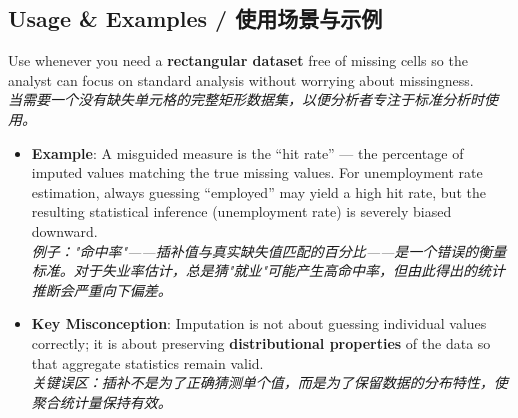 \documentclass[9pt, a4paper]{article}
\begin{document}
\subsection{Usage \& Examples / 使用场景与示例}
Use whenever you need a \textbf{rectangular dataset} free of missing cells so the analyst can focus on standard analysis without worrying about missingness.\\
\textit{当需要一个没有缺失单元格的完整矩形数据集，以便分析者专注于标准分析时使用。}
\begin{itemize}
    \item \textbf{Example}: A misguided measure is the ``hit rate'' --- the percentage of imputed values matching the true missing values. For unemployment rate estimation, always guessing ``employed'' may yield a high hit rate, but the resulting statistical inference (unemployment rate) is severely biased downward.\\
    \textit{例子："命中率"——插补值与真实缺失值匹配的百分比——是一个错误的衡量标准。对于失业率估计，总是猜"就业"可能产生高命中率，但由此得出的统计推断会严重向下偏差。}
    \item \textbf{Key Misconception}: Imputation is not about guessing individual values correctly; it is about preserving \textbf{distributional properties} of the data so that aggregate statistics remain valid.\\
    \textit{关键误区：插补不是为了正确猜测单个值，而是为了保留数据的分布特性，使聚合统计量保持有效。}
\end{itemize}
\end{document}
